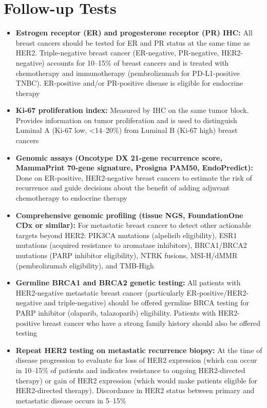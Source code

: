 \section*{Follow-up Tests}
\begin{itemize}
  \item \textbf{Estrogen receptor (ER) and progesterone receptor (PR) IHC:} All breast cancers should be tested for ER and PR status at the same time as HER2. Triple-negative breast cancer (ER-negative, PR-negative, HER2-negative) accounts for 10--15\% of breast cancers and is treated with chemotherapy and immunotherapy (pembrolizumab for PD-L1-positive TNBC). ER-positive and/or PR-positive disease is eligible for endocrine therapy
  \item \textbf{Ki-67 proliferation index:} Measured by IHC on the same tumor block. Provides information on tumor proliferation and is used to distinguish Luminal A (Ki-67 low, <14--20\%) from Luminal B (Ki-67 high) breast cancers
  \item \textbf{Genomic assays (Oncotype DX 21-gene recurrence score, MammaPrint 70-gene signature, Prosigna PAM50, EndoPredict):} Done on ER-positive, HER2-negative breast cancers to estimate the risk of recurrence and guide decisions about the benefit of adding adjuvant chemotherapy to endocrine therapy
  \item \textbf{Comprehensive genomic profiling (tissue NGS, FoundationOne CDx or similar):} For metastatic breast cancer to detect other actionable targets beyond HER2: PIK3CA mutations (alpelisib eligibility), ESR1 mutations (acquired resistance to aromatase inhibitors), BRCA1/BRCA2 mutations (PARP inhibitor eligibility), NTRK fusions, MSI-H/dMMR (pembrolizumab eligibility), and TMB-High
  \item \textbf{Germline BRCA1 and BRCA2 genetic testing:} All patients with HER2-negative metastatic breast cancer (particularly ER-positive/HER2-negative and triple-negative) should be offered germline BRCA testing for PARP inhibitor (olaparib, talazoparib) eligibility. Patients with HER2-positive breast cancer who have a strong family history should also be offered testing
  \item \textbf{Repeat HER2 testing on metastatic recurrence biopsy:} At the time of disease progression to evaluate for loss of HER2 expression (which can occur in 10--15\% of patients and indicates resistance to ongoing HER2-directed therapy) or gain of HER2 expression (which would make patients eligible for HER2-directed therapy). Discordance in HER2 status between primary and metastatic disease occurs in 5--15\%

\end{itemize}
